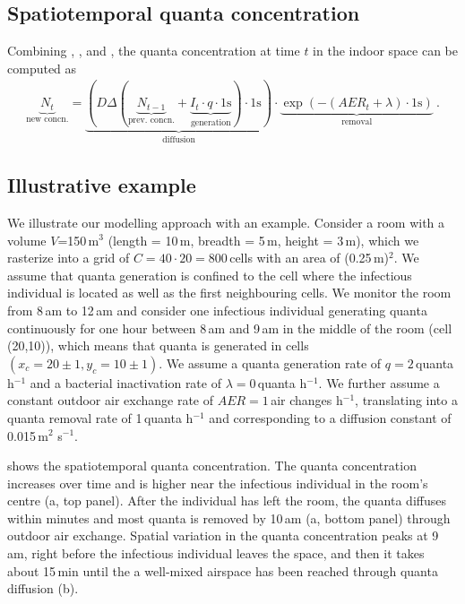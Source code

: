 \documentclass[fleqn,11pt]{wlscirep_supp}
\begin{document}
\subsection{Spatiotemporal quanta concentration}

Combining , , and , the quanta concentration at time $t$ in the indoor space can be computed as
\begin{align}\label{eq:spattemp-N}
    \underbrace{N_{t}}_{\text{new concn.}} = \underbrace{\left(D \Delta (\underbrace{N_{t-1}}_{\text{prev. concn.}} + \underbrace{I_t \cdot q \cdot 1\text{s}}_{\text{generation}}) \cdot 1\text{s}\right)}_{\text{diffusion}} \cdot \underbrace{\exp\left(-(AER_t + \lambda) \cdot 1\text{s}\right)}_{\text{removal}} ~.
\end{align}

\subsection{Illustrative example}\label{sec:example}

We illustrate our modelling approach with an example. Consider a room with a volume $V$=150\,m$^3$ (length = 10\,m, breadth = 5\,m, height = 3\,m), which we rasterize into a grid of $C = 40 \cdot 20 = 800$\,cells with an area of (0.25\,m)$^2$. We assume that quanta generation is confined to the cell where the infectious individual is located as well as the first neighbouring cells. We monitor the room from 8\,am to 12\,am and consider one infectious individual generating quanta continuously for one hour between 8\,am and 9\,am in the middle of the room (cell (20,10)), which means that quanta is generated in cells $(x_c = 20\pm1, y_c = 10\pm1)$. We assume a quanta generation rate of $q = 2$\,quanta h$^{-1}$ and a bacterial inactivation rate of $\lambda = 0$\,quanta h$^{-1}$. We further assume a constant outdoor air exchange rate of $AER = 1$\,air changes h$^{-1}$, translating into a quanta removal rate of 1\,quanta h$^{-1}$ and corresponding to a diffusion constant of 0.015\,m$^2$ s$^{-1}$. 

 shows the spatiotemporal quanta concentration. The quanta concentration increases over time and is higher near the infectious individual in the room's centre (a, top panel). After the individual has left the room, the quanta diffuses within minutes and most quanta is removed by 10\,am (a, bottom panel) through outdoor air exchange. Spatial variation in the quanta concentration peaks at 9\,am, right before the infectious individual leaves the space, and then it takes about 15\,min until the a well-mixed airspace has been reached through quanta diffusion (b). 
\end{document}

